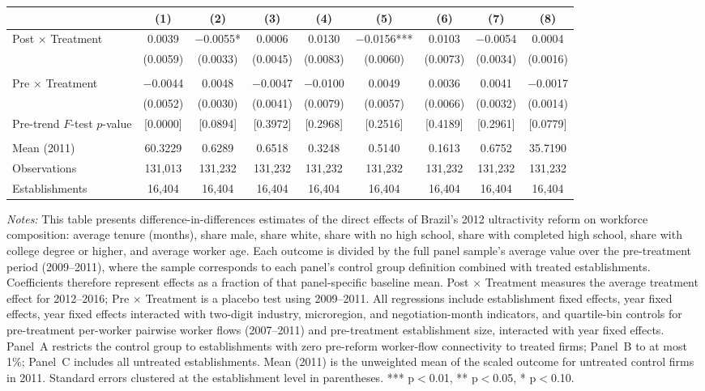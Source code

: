\begin{table}[H]
\begin{threeparttable}
{\begin{tabular}{lcccccccc}
 & (1) & (2) & (3) & (4) & (5) & (6) & (7) & (8) \\
\midrule
Post $\times$ Treatment & 0.0039 & $-$0.0055* & 0.0006 & 0.0130 & $-$0.0156*** & 0.0103 & $-$0.0054 & 0.0004 \\
  & (0.0059) & (0.0033) & (0.0045) & (0.0083) & (0.0060) & (0.0073) & (0.0034) & (0.0016) \\
  &  &  &  &  &  &  &  & \\
Pre $\times$ Treatment & $-$0.0044 & 0.0048 & $-$0.0047 & $-$0.0100 & 0.0049 & 0.0036 & 0.0041 & $-$0.0017 \\
  & (0.0052) & (0.0030) & (0.0041) & (0.0079) & (0.0057) & (0.0066) & (0.0032) & (0.0014) \\
Pre-trend $F$-test $p$-value & [0.0000] & [0.0894] & [0.3972] & [0.2968] & [0.2516] & [0.4189] & [0.2961] & [0.0779] \\
  &  &  &  &  &  &  &  & \\
Mean (2011) & 60.3229 & 0.6289 & 0.6518 & 0.3248 & 0.5140 & 0.1613 & 0.6752 & 35.7190 \\
Observations & 131{,}013 & 131{,}232 & 131{,}232 & 131{,}232 & 131{,}232 & 131{,}232 & 131{,}232 & 131{,}232 \\
Establishments & 16{,}404 & 16{,}404 & 16{,}404 & 16{,}404 & 16{,}404 & 16{,}404 & 16{,}404 & 16{,}404 \\
\bottomrule
\end{tabular}%
}
\scriptsize
\begin{tablenotes}
\item \textit{Notes:} This table presents difference-in-differences estimates of the direct effects of Brazil's 2012 ultractivity reform on workforce composition: average tenure (months), share male, share white, share with no high school, share with completed high school, share with college degree or higher, and average worker age. Each outcome is divided by the full panel sample's average value over the pre-treatment period (2009--2011), where the sample corresponds to each panel's control group definition combined with treated establishments. Coefficients therefore represent effects as a fraction of that panel-specific baseline mean. Post $\times$ Treatment measures the average treatment effect for 2012--2016; Pre $\times$ Treatment is a placebo test using 2009--2011. All regressions include establishment fixed effects, year fixed effects, year fixed effects interacted with two-digit industry, microregion, and negotiation-month indicators, and quartile-bin controls for pre-treatment per-worker pairwise worker flows (2007--2011) and pre-treatment establishment size, interacted with year fixed effects. Panel~A restricts the control group to establishments with zero pre-reform worker-flow connectivity to treated firms; Panel~B to at most 1\%; Panel~C includes all untreated establishments. Mean (2011) is the unweighted mean of the scaled outcome for untreated control firms in 2011. Standard errors clustered at the establishment level in parentheses. *** p$<$0.01, ** p$<$0.05, * p$<$0.10.
\end{tablenotes}
\end{threeparttable}
\end{table}


